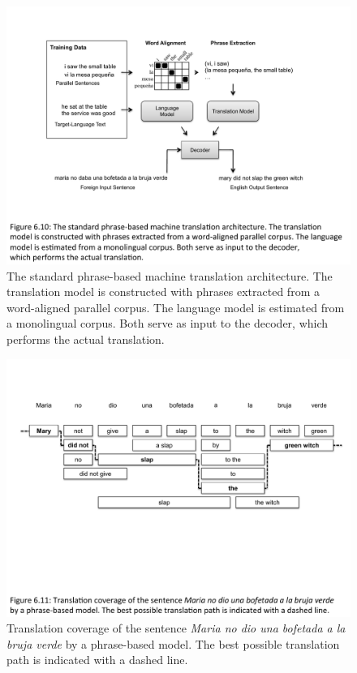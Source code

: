 \begin{figure}[p]
\begin{center}
\includegraphics[scale=0.7]{figures/fig-ch6-MT-arch.pdf}
\end{center}\caption{The standard phrase-based machine translation architecture.  The translation model is constructed with phrases extracted from a word-aligned parallel corpus.  The language model is estimated from a monolingual corpus.  Both serve as input to the decoder, which performs the actual translation.}\label{chapter6_figure_mtarch}
\end{figure}

\begin{figure}[p]
\begin{center}
\includegraphics[scale=0.6]{figures/fig-ch6-MT-tiles.pdf}
\end{center}\caption{Translation coverage of the sentence \emph{Maria no dio una bofetada a la bruja verde} by a phrase-based model. The best possible translation path is indicated with a dashed line.}\label{chapter6_figure_mttiles}
\end{figure}

